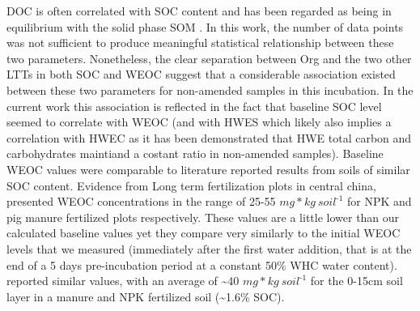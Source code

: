 \documentclass[12pt]{report}
\newlength{\SpaceAfterUnit}
\newcommand{\genericunit}{$ mg * kg\ soil^{\text{-}1}$ \hspace*{\SpaceAfterUnit}}
\begin{document}
DOC is often correlated with SOC content and has been regarded as being in equilibrium with the solid phase SOM \citep{malik2013}. In this work, the number of data points was not sufficient to produce meaningful statistical relationship between these two parameters. Nonetheless, the clear separation between Org and the two other LTTs in both SOC and WEOC suggest that a considerable association existed between these two parameters for non-amended samples in this incubation. In the current work this association is reflected in the fact that baseline SOC level seemed to correlate with WEOC (and with HWES which likely also implies a correlation with HWEC as it has been demonstrated that HWE total carbon and carbohydrates maintiand a costant ratio in non-amended samples).
Baseline WEOC values were comparable to literature reported results from soils of similar SOC content. Evidence from Long term fertilization plots in central china, presented WEOC concentrations in the range of 25-55 \genericunit for NPK and pig manure fertilized plots respectively\citep{xu2018}. These values are a little lower than our calculated baseline values yet they compare very similarly to the initial WEOC levels that we measured (immediately after the first water addition, that is  at the end of a 5 days pre-incubation period at a constant 50\% WHC water content). \citet{hamkalo2014} reported similar values, with an average of \~{}40 \genericunit for the 0-15cm  soil layer in a manure and NPK fertilized soil (\~{}1.6\% SOC).
\end{document}

